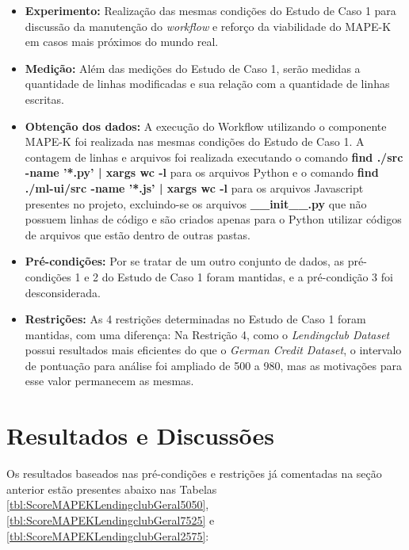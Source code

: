 \documentclass[portugues]{ic-tese}
\begin{document}
\begin{itemize}
\item \textbf{Experimento:} Realização das mesmas condições do Estudo de Caso 1 para discussão da manutenção do \textit{workflow} e reforço da viabilidade do MAPE-K em casos mais próximos do mundo real.

\item \textbf{Medição:} Além das medições do Estudo de Caso 1, serão medidas a quantidade de linhas modificadas e sua relação com a quantidade de linhas escritas.

\item \textbf{Obtenção dos dados:} A execução do Workflow utilizando o componente MAPE-K foi realizada nas mesmas condições do Estudo de Caso 1. A contagem de linhas e arquivos foi realizada executando o comando \textbf{find ./src -name '*.py' | xargs wc -l} para os arquivos Python e o comando \textbf{find ./ml-ui/src -name '*.js' | xargs wc -l} para os arquivos Javascript presentes no projeto, excluindo-se os arquivos \textbf{\_\_init\_\_.py} que não possuem linhas de código e são criados apenas para o Python utilizar códigos de arquivos que estão dentro de outras pastas.

\item \textbf{Pré-condições:} Por se tratar de um outro conjunto de dados, as pré-condições 1 e 2 do Estudo de Caso 1 foram mantidas, e a pré-condição 3 foi desconsiderada.

\item \textbf{Restrições:} As 4 restrições determinadas no Estudo de Caso 1 foram mantidas, com uma diferença: Na Restrição 4, como o \textit{Lendingclub Dataset} possui resultados mais eficientes do que o \textit{German Credit Dataset}, o intervalo de pontuação para análise foi ampliado de 500 a 980, mas as motivações para esse valor permanecem as mesmas.
\end{itemize}

\section{Resultados e Discussões}

Os resultados baseados nas pré-condições e restrições já comentadas na seção anterior estão presentes abaixo nas Tabelas \ref{tbl:ScoreMAPEKLendingclubGeral5050}, \ref{tbl:ScoreMAPEKLendingclubGeral7525} e \ref{tbl:ScoreMAPEKLendingclubGeral2575}:
\end{document}
